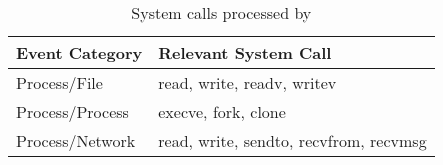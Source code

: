 \begin{table}[t]
\caption{System calls processed by \tool}
\centering
\begin{adjustbox}{width=0.44\textwidth}

\begin{tabular}{|l|l|}
\hline
 \textbf{Event Category}&  \textbf{Relevant System Call}\\ \hline
Process/File & read, write, readv, writev  \\ \hline
Process/Process & execve, fork, clone  \\ \hline
Process/Network & read, write, sendto, recvfrom, recvmsg \\ \hline
\end{tabular}
\end{adjustbox}
\label{tab:events}
\end{table}